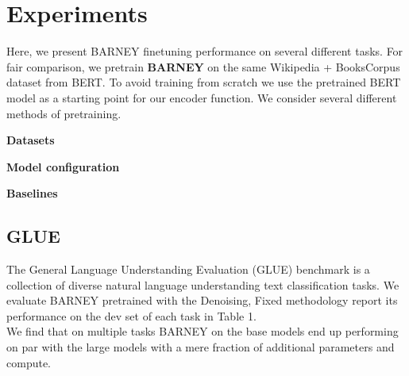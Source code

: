 
\section{Experiments}\label{sec:experiments}
Here, we present BARNEY finetuning performance on several different tasks. 
For fair comparison, we pretrain \textbf{BARNEY} on the same Wikipedia + BooksCorpus dataset from BERT. To avoid training from scratch we use the pretrained BERT model as a starting point for our encoder function. We consider several different methods of pretraining. 



% 

\noindent \textbf{Datasets} 
 
\noindent \textbf{Model configuration} 

\noindent \textbf{Baselines} 

\subsection{GLUE}
The General Language Understanding Evaluation (GLUE) benchmark \citep{wang2018glue} is a collection of diverse natural language understanding text classification tasks. We evaluate BARNEY pretrained with the Denoising, Fixed methodology report its performance on the dev set of each task in Table 1. \\
We find that on multiple tasks BARNEY on the base models end up performing on par with the large models with a mere fraction of additional parameters and compute. 

